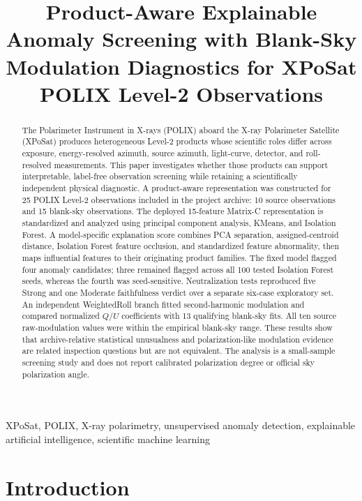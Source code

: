 \documentclass[conference]{IEEEtran}
\title{Product-Aware Explainable Anomaly Screening with Blank-Sky Modulation Diagnostics for XPoSat POLIX Level-2 Observations}
\author{
\IEEEauthorblockN{Author One, Author Two, Author Three, and Project Guide}
\IEEEauthorblockA{Department of [Department Name], [College/University]\\
[City, Country]\\
[corresponding-author email]}
}
\begin{document}
\maketitle

\begin{abstract}
The Polarimeter Instrument in X-rays (POLIX) aboard the X-ray Polarimeter Satellite (XPoSat) produces heterogeneous Level-2 products whose scientific roles differ across exposure, energy-resolved azimuth, source azimuth, light-curve, detector, and roll-resolved measurements. This paper investigates whether those products can support interpretable, label-free observation screening while retaining a scientifically independent physical diagnostic. A product-aware representation was constructed for 25 POLIX Level-2 observations included in the project archive: 10 source observations and 15 blank-sky observations. The deployed 15-feature Matrix-C representation is standardized and analyzed using principal component analysis, KMeans, and Isolation Forest. A model-specific explanation score combines PCA separation, assigned-centroid distance, Isolation Forest feature occlusion, and standardized feature abnormality, then maps influential features to their originating product families. The fixed model flagged four anomaly candidates; three remained flagged across all 100 tested Isolation Forest seeds, whereas the fourth was seed-sensitive. Neutralization tests reproduced five Strong and one Moderate faithfulness verdict over a separate six-case exploratory set. An independent WeightedRoll branch fitted second-harmonic modulation and compared normalized \(Q/U\) coefficients with 13 qualifying blank-sky fits. All ten source raw-modulation values were within the empirical blank-sky range. These results show that archive-relative statistical unusualness and polarization-like modulation evidence are related inspection questions but are not equivalent. The analysis is a small-sample screening study and does not report calibrated polarization degree or official sky polarization angle.
\end{abstract}

\begin{IEEEkeywords}
XPoSat, POLIX, X-ray polarimetry, unsupervised anomaly detection, explainable artificial intelligence, scientific machine learning
\end{IEEEkeywords}

\section{Introduction}
\end{document}
